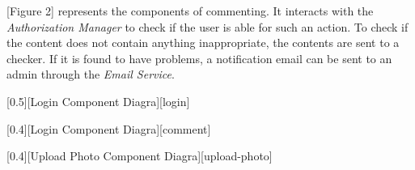 \documentclass{article}
\begin{document}
		[Figure 2] represents the components of commenting. It interacts with the \textit{Authorization Manager} to check if the user is able for such an action. To check if the content does not contain anything inappropriate, the contents are sent to a checker. If it is found to have problems, a notification email can be sent to an admin through the \textit{Email Service}.

		[0.5][Login Component Diagra][login]

		[0.4][Login Component Diagra][comment]

		[0.4][Upload Photo Component Diagra][upload-photo]
\end{document}
